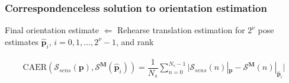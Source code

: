 \begin{frame}[noframenumbering]

  \frametitle{Correspondenceless solution to orientation estimation}

  Final orientation estimate $\Leftarrow$ Rehearse translation estimation for $2^\nu$ pose estimates $\hat{\bm{p}}_i$, $i = 0,1,\dots,2^\nu-1$, and rank
  \vspace{-0.5cm}

  \begin{align}
    \text{CAER}(\mathcal{S}_{sens}(\bm{p}), \mathcal{S}^{\bm{M}}(\hat{\bm{p}}_i)) = \dfrac{1}{N_s} \sum\limits_{n=0}^{N_s-1}\Bigg|\mathcal{S}_{sens}(n)|_{\bm{p}}-\mathcal{S}^{\bm{M}}(n)|_{\hat{\bm{p}}_i} \Bigg| \nonumber
  \end{align}
  \vspace{-0.5cm}

  \begin{figure}
    
  \end{figure}

\end{frame}

